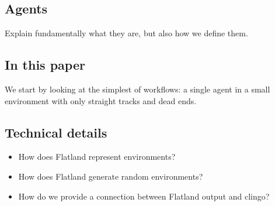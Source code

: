 \documentclass[11pt]{article}
\begin{document}
\subsection{Agents}
Explain fundamentally what they are, but also how we define them.

\subsection{In this paper}
We start by looking at the simplest of workflows: a single agent in a small environment with only straight tracks and dead ends.

\subsection{Technical details}
\begin{itemize}
  \item How does Flatland represent environments?
  \item How does Flatland generate random environments?
  \item How do we provide a connection between Flatland output and clingo?
\end{itemize} 



\end{document}
